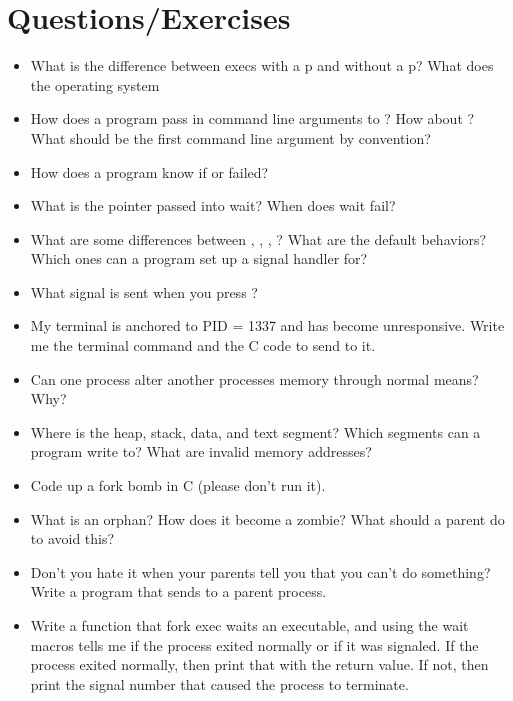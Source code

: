\section{Questions/Exercises}

\begin{itemize}
    \item
          What is the difference between execs with a p and without a p? What does the operating system
    \item
          How does a program pass in command line arguments to ? How about ? What should be the first command line argument by convention?
    \item
          How does a program know if  or  failed?
    \item
          What is the  pointer passed into wait? When does wait fail?
    \item
          What are some differences between , , , ? What are the default behaviors? Which ones can a program set up a signal handler for?
    \item
          What signal is sent when you press ?
    \item
          My terminal is anchored to PID = 1337 and has become unresponsive. Write me the terminal command and the C code to send  to it.
    \item
          Can one process alter another processes memory through normal means? Why?
    \item
          Where is the heap, stack, data, and text segment? Which segments can a program write to? What are invalid memory addresses?
    \item
          Code up a fork bomb in C (please don't run it).
    \item
          What is an orphan? How does it become a zombie? What should a parent do to avoid this?
    \item
      Don't you hate it when your parents tell you that you can't do something?
      Write a program that sends  to a parent process.
    \item
          Write a function that fork exec waits an executable, and using the wait macros tells me if the process exited normally or if it was signaled. If the process exited normally, then print that with the return value. If not, then print the signal number that caused the process to terminate.
\end{itemize}



